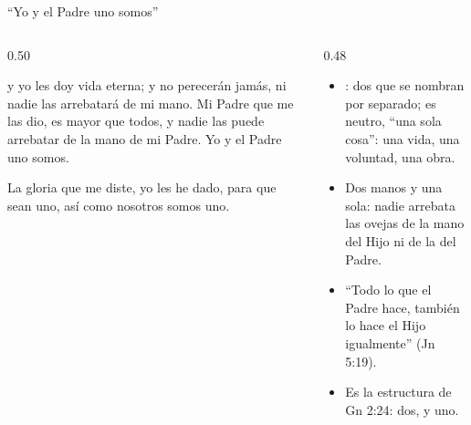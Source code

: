 \begin{frame}{``Yo y el Padre uno somos''}
\begin{columns}[t,onlytextwidth]
\begin{column}{0.50\textwidth}
\begin{cita}[fontupper=\scriptsize\itshape]y yo les doy vida eterna; y no perecerán jamás, ni nadie las arrebatará de mi mano. Mi Padre que me las dio, es mayor que todos, y nadie las puede arrebatar de la mano de mi Padre. Yo y el Padre uno somos.\end{cita}
\begin{cita}[fontupper=\scriptsize\itshape]La gloria que me diste, yo les he dado, para que sean uno, así como nosotros somos uno.\end{cita}
\end{column}
\begin{column}{0.48\textwidth}\small
\begin{itemize}
\item {}: dos que se nombran por separado;  es neutro, ``una sola cosa'': una vida, una voluntad, una obra.
\item Dos manos y una sola: nadie arrebata las ovejas de la mano del Hijo ni de la del Padre.
\item ``Todo lo que el Padre hace, también lo hace el Hijo igualmente'' (Jn 5:19).
\item Es la estructura de Gn 2:24: dos, y uno.
\end{itemize}
\end{column}
\end{columns}
\end{frame}

